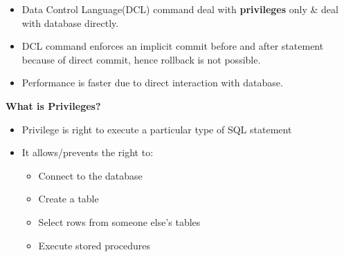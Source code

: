 
\begin{flushleft}
	
	\begin{itemize}
		\item Data Control Language(DCL) command deal with \textbf{privileges} only \& deal with database directly.
		\item DCL command enforces an implicit commit before and after statement because of direct commit, hence rollback is not possible.
		\item Performance is faster due to direct interaction with database.
		
	\end{itemize}

	\textbf{What is Privileges?}
	\begin{itemize}
		\item Privilege is right to execute a particular type of SQL statement
		\item It allows/prevents the right to:
		\begin{itemize}
			\item Connect to the database
			\item Create a table
			\item Select rows from someone else's tables
			\item Execute stored procedures
		\end{itemize}
	\end{itemize}
		
\end{flushleft}
